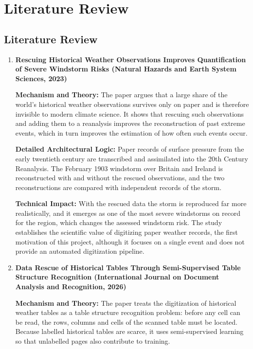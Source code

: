 \setcounter{equation}{0}
\chapter{Literature Review}
\label{chap:literature}

\section{Literature Review}
\label{sec:lit-review}

\begin{enumerate}

\item \textbf{Rescuing Historical Weather Observations Improves Quantification of Severe Windstorm Risks (Natural Hazards and Earth System Sciences, 2023)}

\textbf{Mechanism and Theory:} The paper argues that a large share of the world's historical weather observations survives only on paper and is therefore invisible to modern climate science. It shows that rescuing such observations and adding them to a reanalysis improves the reconstruction of past extreme events, which in turn improves the estimation of how often such events occur.

\textbf{Detailed Architectural Logic:} Paper records of surface pressure from the early twentieth century are transcribed and assimilated into the 20th Century Reanalysis. The February 1903 windstorm over Britain and Ireland is reconstructed with and without the rescued observations, and the two reconstructions are compared with independent records of the storm.

\textbf{Technical Impact:} With the rescued data the storm is reproduced far more realistically, and it emerges as one of the most severe windstorms on record for the region, which changes the assessed windstorm risk. The study establishes the scientific value of digitizing paper weather records, the first motivation of this project, although it focuses on a single event and does not provide an automated digitization pipeline.

\item \textbf{Data Rescue of Historical Tables Through Semi-Supervised Table Structure Recognition (International Journal on Document Analysis and Recognition, 2026)}

\textbf{Mechanism and Theory:} The paper treats the digitization of historical weather tables as a table structure recognition problem: before any cell can be read, the rows, columns and cells of the scanned table must be located. Because labelled historical tables are scarce, it uses semi-supervised learning so that unlabelled pages also contribute to training.


\end{enumerate}
